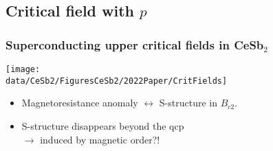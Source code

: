\subsection{Critical field with $p$}
\begin{frame}[label=CriticalFields]
\frametitle{Superconducting upper critical fields in CeSb$_2$}

\centerline{\texttt{[image: \\data/CeSb2/FiguresCeSb2/2022Paper/CritFields]}}

%
\begin{itemize}
\item Magnetoresistance anomaly $\leftrightarrow$ S-structure in $B_{c2}$.
\item S-structure disappears beyond the qcp \\ \raggedleft $\rightarrow$ induced by magnetic order?! %

\end{itemize}

\end{frame}

